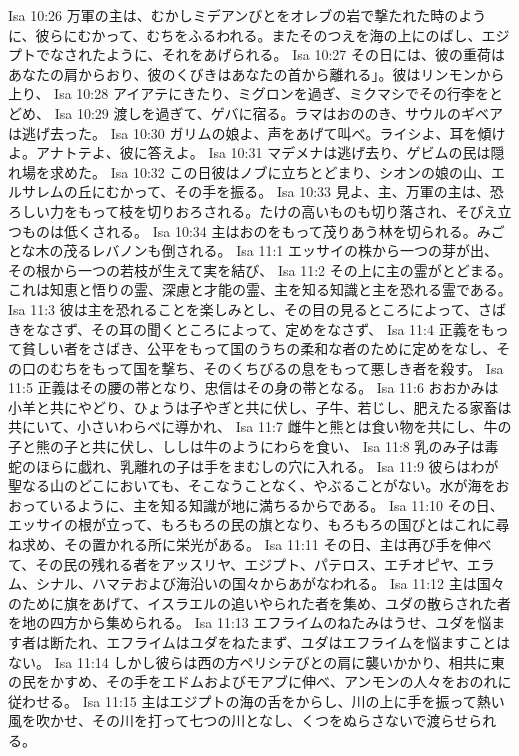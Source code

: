 Isa 10:26  万軍の主は、むかしミデアンびとをオレブの岩で撃たれた時のように、彼らにむかって、むちをふるわれる。またそのつえを海の上にのばし、エジプトでなされたように、それをあげられる。
Isa 10:27  その日には、彼の重荷はあなたの肩からおり、彼のくびきはあなたの首から離れる」。彼はリンモンから上り、
Isa 10:28  アイアテにきたり、ミグロンを過ぎ、ミクマシでその行李をとどめ、
Isa 10:29  渡しを過ぎて、ゲバに宿る。ラマはおののき、サウルのギベアは逃げ去った。
Isa 10:30  ガリムの娘よ、声をあげて叫べ。ライシよ、耳を傾けよ。アナトテよ、彼に答えよ。
Isa 10:31  マデメナは逃げ去り、ゲビムの民は隠れ場を求めた。
Isa 10:32  この日彼はノブに立ちとどまり、シオンの娘の山、エルサレムの丘にむかって、その手を振る。
Isa 10:33  見よ、主、万軍の主は、恐ろしい力をもって枝を切りおろされる。たけの高いものも切り落され、そびえ立つものは低くされる。
Isa 10:34  主はおのをもって茂りあう林を切られる。みごとな木の茂るレバノンも倒される。
Isa 11:1  エッサイの株から一つの芽が出、その根から一つの若枝が生えて実を結び、
Isa 11:2  その上に主の霊がとどまる。これは知恵と悟りの霊、深慮と才能の霊、主を知る知識と主を恐れる霊である。
Isa 11:3  彼は主を恐れることを楽しみとし、その目の見るところによって、さばきをなさず、その耳の聞くところによって、定めをなさず、
Isa 11:4  正義をもって貧しい者をさばき、公平をもって国のうちの柔和な者のために定めをなし、その口のむちをもって国を撃ち、そのくちびるの息をもって悪しき者を殺す。
Isa 11:5  正義はその腰の帯となり、忠信はその身の帯となる。
Isa 11:6  おおかみは小羊と共にやどり、ひょうは子やぎと共に伏し、子牛、若じし、肥えたる家畜は共にいて、小さいわらべに導かれ、
Isa 11:7  雌牛と熊とは食い物を共にし、牛の子と熊の子と共に伏し、ししは牛のようにわらを食い、
Isa 11:8  乳のみ子は毒蛇のほらに戯れ、乳離れの子は手をまむしの穴に入れる。
Isa 11:9  彼らはわが聖なる山のどこにおいても、そこなうことなく、やぶることがない。水が海をおおっているように、主を知る知識が地に満ちるからである。
Isa 11:10  その日、エッサイの根が立って、もろもろの民の旗となり、もろもろの国びとはこれに尋ね求め、その置かれる所に栄光がある。
Isa 11:11  その日、主は再び手を伸べて、その民の残れる者をアッスリヤ、エジプト、パテロス、エチオピヤ、エラム、シナル、ハマテおよび海沿いの国々からあがなわれる。
Isa 11:12  主は国々のために旗をあげて、イスラエルの追いやられた者を集め、ユダの散らされた者を地の四方から集められる。
Isa 11:13  エフライムのねたみはうせ、ユダを悩ます者は断たれ、エフライムはユダをねたまず、ユダはエフライムを悩ますことはない。
Isa 11:14  しかし彼らは西の方ペリシテびとの肩に襲いかかり、相共に東の民をかすめ、その手をエドムおよびモアブに伸べ、アンモンの人々をおのれに従わせる。
Isa 11:15  主はエジプトの海の舌をからし、川の上に手を振って熱い風を吹かせ、その川を打って七つの川となし、くつをぬらさないで渡らせられる。
